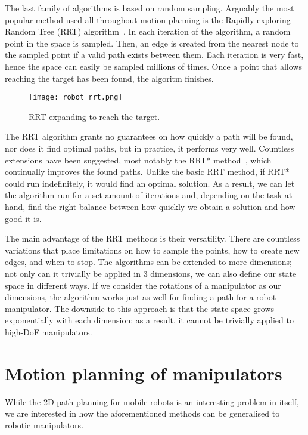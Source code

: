 The last family of algorithms is based on random sampling. Arguably the most popular method used all throughout motion planning is the Rapidly-exploring Random Tree (RRT) algorithm~\cite{LaValle1998RapidlyexploringRT}. In each iteration of the algorithm, a random point in the space is sampled. Then, an edge is created from the nearest node to the sampled point if a valid path exists between them. Each iteration is very fast, hence the space can easily be sampled millions of times. Once a point that allows reaching the target has been found, the algoritm finishes.

\begin{figure}[h]
  \centering
  \texttt{[image: robot\_rrt.png]}
  \caption{RRT expanding to reach the target.}
\end{figure}

The RRT algorithm grants no guarantees on how quickly a path will be found, nor does it find optimal paths, but in practice, it performs very well. Countless extensions have been suggested, most notably the RRT* method~\cite{rrt_star}, which continually improves the found paths. Unlike the basic RRT method, if RRT* could run indefinitely, it would find an optimal solution. As a result, we can let the algorithm run for a set amount of iterations and, depending on the task at hand, find the right balance between how quickly we obtain a solution and how good it is.

The main advantage of the RRT methods is their versatility. There are countless variations that place limitations on how to sample the points, how to create new edges, and when to stop. The algorithms can be extended to more dimensions; not only can it trivially be applied in 3 dimensions, we can also define our state space in different ways. If we consider the rotations of a manipulator as our dimensions, the algorithm works just as well for finding a path for a robot manipulator. The downside to this approach is that the state space grows exponentially with each dimension; as a result, it cannot be trivially applied to high-DoF manipulators.

\section{Motion planning of manipulators}

While the 2D path planning for mobile robots is an interesting problem in itself, we are interested in how the aforementioned methods can be generalised to robotic manipulators.

